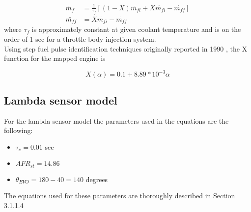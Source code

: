 \begin{appendices}
\begin{align}
\ddot{m_{f}}&=\frac{1}{\tau _{f}}[(1-X)\ddot{m_{fi}}+X\dot{m_{fi}}-\dot{m_{ff}}]
\\
\ddot{m_{ff}}&=X\dot{m_{fi}}-\dot{m_{ff}}
\end{align}
where $\tau _{f}$ is approximately constant at given coolant temperature and is on the order of 1 sec for a throttle body injection system.
\\

Using step fuel pulse identification techniques originally reported in 1990 \cite{hendricks1990mean}, the X function for the mapped engine is

\begin{equation}
X(\alpha) = 0.1+8.89*10^{-3}\alpha
\end{equation}


\subsection*{Lambda sensor model}

For the lambda sensor model the parameters used in the equations are the following:

\begin{itemize}
	\item $\tau _{e}=0.01$ sec
	\item $AFR_{st}=14.86$
	\item $\theta _{EVO}= 180-40=140$ degrees
\end{itemize}
The equations used for these parameters are thoroughly described in Section 3.1.1.4


\end{appendices}